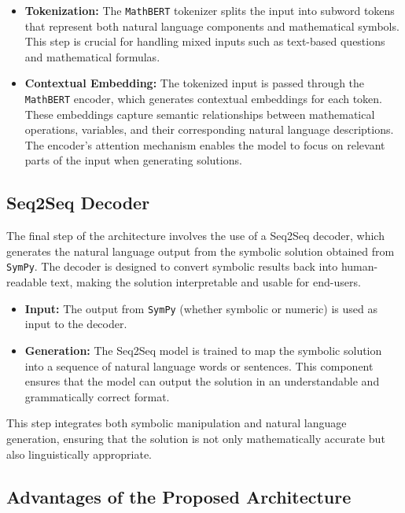 \documentclass{article}
\begin{document}
\begin{itemize}
    \item \textbf{Tokenization:} The \texttt{MathBERT} tokenizer splits the input into subword tokens that represent both natural language components and mathematical symbols. This step is crucial for handling mixed inputs such as text-based questions and mathematical formulas.
    \item \textbf{Contextual Embedding:} The tokenized input is passed through the \texttt{MathBERT} encoder, which generates contextual embeddings for each token. These embeddings capture semantic relationships between mathematical operations, variables, and their corresponding natural language descriptions. The encoder's attention mechanism enables the model to focus on relevant parts of the input when generating solutions.
\end{itemize}

\subsection{Seq2Seq Decoder}

The final step of the architecture involves the use of a Seq2Seq decoder, which generates the natural language output from the symbolic solution obtained from \texttt{SymPy}. The decoder is designed to convert symbolic results back into human-readable text, making the solution interpretable and usable for end-users.

\begin{itemize}
    \item \textbf{Input:} The output from \texttt{SymPy} (whether symbolic or numeric) is used as input to the decoder.
    \item \textbf{Generation:} The Seq2Seq model is trained to map the symbolic solution into a sequence of natural language words or sentences. This component ensures that the model can output the solution in an understandable and grammatically correct format.
\end{itemize}

This step integrates both symbolic manipulation and natural language generation, ensuring that the solution is not only mathematically accurate but also linguistically appropriate.

\subsection{Advantages of the Proposed Architecture}
\end{document}
